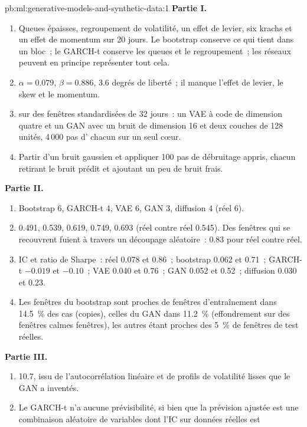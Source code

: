 \begin{solution}{pb:ml:generative-models-and-synthetic-data:1}
\textbf{Partie I.}
\begin{enumerate}
\item Queues épaisses, regroupement de volatilité, un effet de levier, six krachs et un effet de momentum sur 20 jours. Le bootstrap conserve
ce qui tient dans un bloc~; le GARCH-t conserve les queues et le regroupement~; les réseaux peuvent en principe représenter tout cela.
\item $\alpha = 0.079$, $\beta = 0.886$, 3.6 degrés de liberté~; il manque l'effet de levier, le skew et le momentum.
\item {} sur des fenêtres standardisées de 32 jours~: un VAE à code de dimension quatre et un GAN avec un bruit
de dimension 16 et deux couches de 128 unités, 4\,000 pas d' chacun sur un seul cœur.
\item Partir d'un bruit gaussien et appliquer 100 pas de débruitage appris, chacun retirant le bruit prédit et ajoutant un peu
de bruit frais.
\end{enumerate}
\textbf{Partie II.}
\begin{enumerate}[resume]
\item Bootstrap 6, GARCH-t 4, VAE 6, GAN 3, diffusion 4 (réel 6).
\item 0.491, 0.539, 0.619, 0.749, 0.693 (réel contre réel 0.545). Des fenêtres qui se recouvrent fuient à travers un découpage aléatoire~: 0.83 pour
réel contre réel.
\item IC et ratio de Sharpe~: réel 0.078 et 0.86~; bootstrap 0.062 et 0.71~; GARCH-t $-0.019$ et $-0.10$~; VAE 0.040 et 0.76~; GAN
0.052 et 0.52~; diffusion 0.030 et 0.23.
\item Les fenêtres du bootstrap sont proches de fenêtres d'entraînement dans 14.5~\% des cas (copies), celles du GAN dans 11.2~\% (effondrement sur des fenêtres calmes
fenêtres), les autres étant proches des 5~\% de fenêtres de test réelles.
\end{enumerate}
\textbf{Partie III.}
\begin{enumerate}[resume]
\item 10.7, issu de l'autocorrélation linéaire et de profils de volatilité lisses que le GAN a inventés.
\item Le GARCH-t n'a aucune prévisibilité, si bien que la prévision ajustée est une combinaison aléatoire de variables dont l'IC sur données réelles est

\end{enumerate}
\end{solution}
